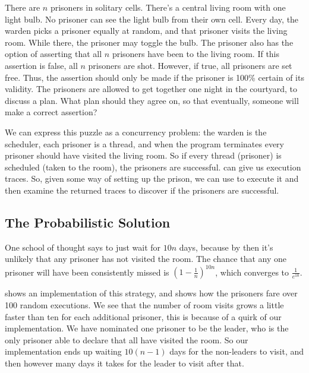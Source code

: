 \begin{displayquote}
  There are $n$ prisoners in solitary cells.  There's a central living
  room with one light bulb.  No prisoner can see the light bulb from
  their own cell.  Every day, the warden picks a prisoner equally at
  random, and that prisoner visits the living room.  While there, the
  prisoner may toggle the bulb.  The prisoner also has the option of
  asserting that all $n$ prisoners have been to the living room.  If
  this assertion is false, all $n$ prisoners are shot.  However, if
  true, all prisoners are set free.  Thus, the assertion should only
  be made if the prisoner is 100\% certain of its validity.  The
  prisoners are allowed to get together one night in the courtyard, to
  discuss a plan.  What plan should they agree on, so that eventually,
  someone will make a correct assertion?
\end{displayquote}

We can express this puzzle as a concurrency problem: the warden is the
scheduler, each prisoner is a thread, and when the program terminates
every prisoner should have visited the living room.  So if every
thread (prisoner) is scheduled (taken to the room), the prisoners are
successful.  \dejafu{} can give us execution traces.  So, given some
way of setting up the prison, we can use \dejafu{} to execute it and
then examine the returned traces to discover if the prisoners are
successful.

\subsection{The Probabilistic Solution}

One school of thought says to just wait for $10 n$ days, because by
then it's unlikely that any prisoner has not visited the room.  The
chance that any one prisoner will have been consistently missed is
$\left(1 - \frac{1}{n}\right)^{10n}$, which converges to
$\frac{1}{e^{10}}$.

 shows an implementation of this strategy, and
 shows how the prisoners fare over 100 random
executions.  We see that the number of room visits grows a little
faster than ten for each additional prisoner, this is because of a
quirk of our implementation.  We have nominated one prisoner to be the
leader, who is the only prisoner able to declare that all have visited
the room.  So our implementation ends up waiting $10 (n - 1)$ days for
the non-leaders to visit, and then however many days it takes for the
leader to visit after that.

